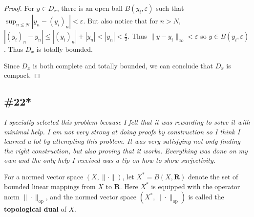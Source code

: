 \documentclass{article}
\newcommand{\R}{\mathbf{R}}
\theoremstyle{plain} %
\numberwithin{thm}{section} %
\theoremstyle{definition}
\begin{document}
\begin{proof}
            For \(y \in D_x\), there is an open ball \(B(y_i, \varepsilon)\) such that \(\sup_{n\leq N} {|y_n - (y_i)_n|} < \varepsilon\). But also notice that for \(n>N\), \(|(y_i)_n - y_n| \leq |(y_i)_n| + |y_n| < |y_n| < \frac{\varepsilon}{2}\). Thus \(\|y-y_i\| _{\infty} < \varepsilon\) so \(y \in B(y_i, \varepsilon)\). Thus \(D_x\) is totally bounded.

            Since \(D_x\) is both complete and totally bounded, we can conclude that \(D_x\) is compact.
        \end{proof}

        \subsection{\#22*}
        \textit{I specially selected this problem because I felt that it was rewarding to solve it with minimal help. I am not very strong at doing proofs by construction so I think I learned a lot by attempting this problem. It was very satisfying not only finding the right construction, but also proving that it works. Everything was done on my own and the only help I received was a tip on how to show surjectivity.}

        \medskip

        For a normed vector space $(X,\|\cdot\|)$, let $X^*=B(X,\R)$ denote the set of bounded linear mappings from $X$ to $\R$. Here $X^*$ is equipped with the operator norm $\|\cdot\|_{\mathrm{op}}$, and the normed vector space $(X^*,\|\cdot\|_{\mathrm{op}})$ is called the \textbf{topological dual} of $X$.
\end{document}
